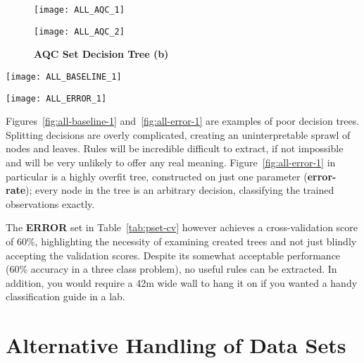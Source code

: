 \begin{figure}[htbp!]
    \centering
    \texttt{[image: ALL\_AQC\_1]}
    \caption[all-aqc-1]{\textbf{AQC Set Decision Tree (a)}}
    \label{fig:all-aqc-1}

    \vspace{20mm}

    \texttt{[image: ALL\_AQC\_2]}
    \caption[all-aqc-1]{\textbf{AQC Set Decision Tree (b)}}
    \label{fig:all-aqc-2}
\end{figure}
\begin{sidewaysfigure}[htbp!]
    \centering
    \texttt{[image: ALL\_BASELINE\_1]}
    \caption[all-baseline-1]{\textbf{BASELINE Set Decision Tree}: A
    decision tree trained using the \textbf{BASELINE} set.}
    \label{fig:all-baseline-1}

    \vspace{20mm}

    \texttt{[image: ALL\_ERROR\_1]}
    \caption[all-error-1]{\textbf{ERROR Set Decision Tree}: A highly
        overfit decision tree trained on the single parameter \textbf{ERROR}
    set.}
    \label{fig:all-error-1}
\end{sidewaysfigure}


Figures~\ref{fig:all-baseline-1} and~\ref{fig:all-error-1} are examples of
poor decision trees. Splitting decisions are overly complicated, creating an
uninterpretable sprawl of nodes and leaves. Rules will be incredible difficult
to extract, if not impossible and will be very unlikely to offer any real
meaning. Figure~\ref{fig:all-error-1} in particular is a highly overfit tree,
constructed on just one parameter (\textbf{error-rate}); every node in the tree
is an arbitrary decision, classifying the trained observations exactly.

The \textbf{ERROR} set in Table~\ref{tab:pset-cv} however achieves a
cross-validation score of 60\%, highlighting the necessity of examining created
trees and not just blindly accepting the validation scores. Despite its somewhat
acceptable performance (60\% accuracy in a three class problem), no useful rules
can be extracted. In addition, you would require a 42m wide wall to hang it on
if you wanted a handy classification guide in a lab.




\section{Alternative Handling of Data Sets}

